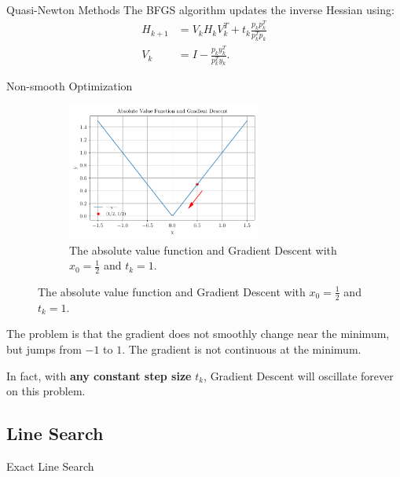 \documentclass{beamer}
\begin{document}
\begin{frame}{Quasi-Newton Methods}
     {
        The BFGS algorithm updates the inverse Hessian using:
        \begin{align*}
            H_{k + 1} & = V_k H_k V_k^T + t_k \frac{
                p_k p_k^T
            }{p_k^T p_k}                                   \\
            V_k       & = I - \frac{p_k y_k^T}{p_k^T y_k}.
        \end{align*}
    }
\end{frame}

\begin{frame}{Non-smooth Optimization}
     {
        \begin{figure}
            \begin{figure}
                \centering
                \includegraphics[width=0.7\textwidth]{plots/abs_val_func.pdf}
                \caption{The absolute value function and Gradient Descent
                    with $x_0 = \frac{1}{2}$ and $t_k = 1$.}
                \label{fig:abs_value_function}
            \end{figure}
        \end{figure}
    }

     {
        The problem is that the gradient does not smoothly change
        near the minimum, but jumps from $-1$ to $1$.
        The gradient is not continuous at the minimum.
    }

     {
        In fact, with \textbf{any constant step size} $t_k$,
        Gradient Descent will oscillate forever on this problem.
    }
\end{frame}

\subsection{Line Search}
\begin{frame}{Exact Line Search}
\end{frame}
\end{document}
